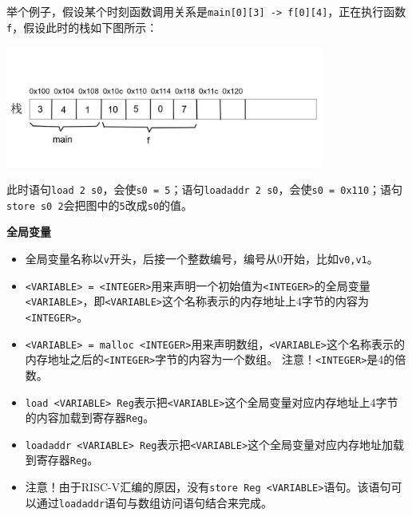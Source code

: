 举个例子，假设某个时刻函数调用关系是\texttt{main[0][3] -> f[0][4]}，正在执行函数\texttt{f}，假设此时的栈如下图所示：

\begin{center}\includegraphics[height=4cm]{stack2}\end{center}

此时语句\texttt{load 2 s0}，会使\texttt{s0 = 5}；语句\texttt{loadaddr 2 s0}，会使\texttt{s0 = 0x110}；语句\texttt{store s0 2}会把图中的\texttt{5}改成\texttt{s0}的值。

\noindent \textbf{全局变量}

\begin{itemize}
\item
全局变量名称以\texttt{v}开头，后接一个整数编号，编号从0开始，比如\texttt{v0,v1}。

\item
\texttt{<VARIABLE> = <INTEGER>}用来声明一个初始值为\texttt{<INTEGER>}的全局变量\texttt{<VARIABLE>}，即\texttt{<VARIABLE>}这个名称表示的内存地址上4字节的内容为\texttt{<INTEGER>}。

\item
\texttt{<VARIABLE> = malloc <INTEGER>}用来声明数组，\texttt{<VARIABLE>}这个名称表示的内存地址之后的\texttt{<INTEGER>}字节的内容为一个数组。
注意！\texttt{<INTEGER>}是4的倍数。


\item
\texttt{load <VARIABLE> Reg}表示把\texttt{<VARIABLE>}这个全局变量对应内存地址上4字节的内容加载到寄存器\texttt{Reg}。

\item
\texttt{loadaddr <VARIABLE> Reg}表示把\texttt{<VARIABLE>}这个全局变量对应内存地址加载到寄存器\texttt{Reg}。

\item
注意！由于RISC-V汇编的原因，没有\texttt{store Reg <VARIABLE>}语句。该语句可以通过\texttt{loadaddr}语句与数组访问语句结合来完成。
\end{itemize}

